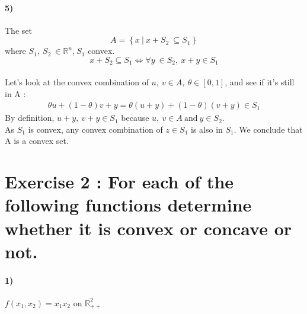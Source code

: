 \documentclass[12pt,a4paper]{article}
\begin{document}
\paragraph{5)} The set $$A= \left\lbrace x~|~x+S_2 ~\subseteq S_1\right\rbrace $$ where $ S_1,~S_2~\in \mathbb{R}^n $,$ ~S_1 $ convex.\\
\begin{equation*}
	x+S_2 \subseteq S_1 \Leftrightarrow \forall y~\in S_2,~x+y\in S_1
\end{equation*}
\\
Let's look at the convex combination of $ u,~v \in A,~\theta \in [0,1] $, and see if it's still in A :\\
\begin{align*}
	\theta u + (1-\theta)v  + y = \theta(u+y) + (1-\theta)(v+y) \in S_1
\end{align*}
By definition, $ u+y,~v+y \in S_1 $ because $ u,~v \in A~\text{and}~y \in S_2 $. \\
As $ S_1 $ is convex, any convex combination of $ z \in S_1 $ is also in $ S_1 $. 
We conclude that A is a convex set.
\section{\textbf{Exercise 2 : }For each of the following functions determine whether it is convex or concave or not.}
\paragraph{1)} $ f(x_1,x_2)=x_1x_2 $ on $ \mathbb{R}^2_{++} $
\\ 
\end{document}
